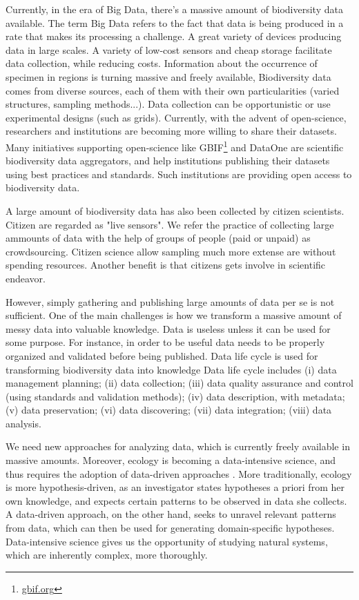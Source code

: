 Currently, in the era of Big Data, there's a massive amount of biodiversity data available. 
The term Big Data refers to the fact that data is being produced in a rate that makes its processing a challenge.
A great variety of devices producing data in large scales.
A variety of low-cost sensors and cheap storage facilitate data collection, while reducing costs.
Information about the occurrence of specimen in regions is turning massive and freely available,
Biodiversity data comes from diverse sources, each of them with their own particularities (varied structures, sampling methods...).
Data collection can be opportunistic or use experimental designs (such as grids).
Currently, with the advent of open-science, researchers and institutions are becoming more willing to share their datasets. 
Many initiatives supporting open-science like GBIF\footnote{\url{gbif.org}} \cite{gbif} and DataOne are scientific biodiversity data aggregators, and help institutions publishing their datasets using best practices and standards. %
Such institutions are providing open access to biodiversity data.


A large amount of biodiversity data has also been collected by citizen scientists. 
Citizen are regarded as "live sensors".
We refer the practice of collecting large ammounts of data with the help of groups of people (paid or unpaid) as crowdsourcing.
Citizen science allow sampling much more extense are without spending resources.
Another benefit is that citizens gets involve in scientific endeavor.


However, simply gathering and publishing large amounts of data per se is not sufficient.
One of the main challenges is how we transform a massive amount of messy data into valuable knowledge.
Data is useless unless it can be used for some purpose.
For instance, in order to be useful data needs to be properly organized and validated before being published.
Data life cycle is used for transforming biodiversity data into knowledge \cite{Michener2012}
Data life cycle includes (i) data management planning; (ii) data collection; (iii) data quality assurance and control (using standards and validation methods); (iv) data description, with metadata; (v) data preservation; (vi) data discovering; (vii) data integration; (viii) data analysis. 


We need new approaches for analyzing data, which is currently freely available in massive amounts.
Moreover, ecology is becoming a data-intensive science, and thus requires the adoption of data-driven approaches \cite{Kelling2009}.
More traditionally, ecology is more hypothesis-driven, as an investigator states hypotheses a priori from her own knowledge, and expects certain patterns to be observed in data she collects.
A data-driven approach, on the other hand, seeks to unravel relevant patterns from data, which can then be used for generating domain-specific hypotheses.
Data-intensive science gives us the opportunity of studying natural systems, which are inherently complex, more thoroughly.



